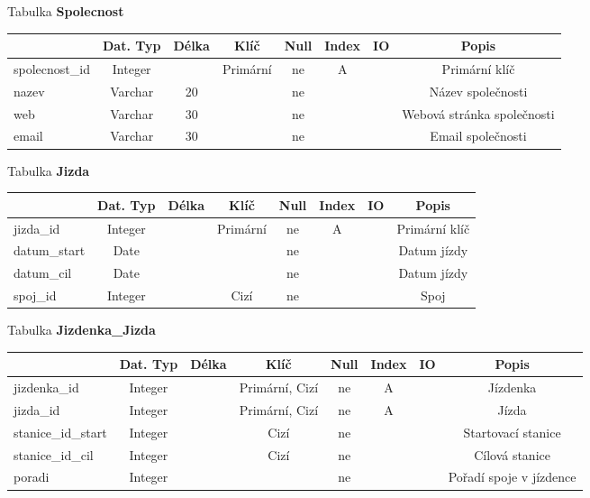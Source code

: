 \documentclass[11pt]{article}
\begin{document}
\noindent
Tabulka \textbf{Spolecnost}

\begin{table}[H]
    \begin{tabular}{|l|c|c|c|c|c|c|c|} \hline
                        & Dat. Typ  & Délka & Klíč      & Null  & Index & IO    & Popis \\ \hline
        spolecnost\_id	& Integer	&	    & Primární	& ne	& A		&       & Primární klíč \\ \hline
        nazev	        & Varchar	& 20	&	        & ne	&		&       & Název společnosti \\ \hline
        web             & Varchar   & 30    &           & ne    &       &       & Webová stránka společnosti \\ \hline
        email           & Varchar   & 30    &           & ne    &       &       & Email společnosti \\ \hline
    \end{tabular}
\end{table}

\noindent
Tabulka \textbf{Jizda}

\begin{table}[H]
    \begin{tabular}{|l|c|c|c|c|c|c|c|} \hline
                    & Dat. Typ  & Délka & Klíč      & Null  & Index & IO    & Popis \\ \hline
        jizda\_id	& Integer	&	    & Primární	& ne	& A		&       & Primární klíč \\ \hline
        datum\_start& Date		&	    &           & ne	&		&       & Datum jízdy \\ \hline
        datum\_cil	& Date		&	    &           & ne	&		&       & Datum jízdy \\ \hline
        spoj\_id	& Integer	&	    & Cizí	    & ne	&   	&	    & Spoj \\ \hline
    \end{tabular}
\end{table}

\noindent
Tabulka \textbf{Jizdenka\_Jizda}

\begin{table}[H]
    \begin{tabular}{|l|c|c|c|c|c|c|c|} \hline
                        & Dat. Typ  & Délka & Klíč              & Null  & Index & IO    & Popis \\ \hline
    jizdenka\_id        & Integer   &       & Primární, Cizí    & ne    & A     &       & Jízdenka \\ \hline
    jizda\_id           & Integer   &       & Primární, Cizí	& ne	& A     &       & Jízda \\ \hline
    stanice\_id\_start  & Integer   &       & Cizí              & ne    &       &       & Startovací stanice \\ \hline
    stanice\_id\_cil    & Integer   &       & Cizí              & ne    &       &       & Cílová stanice \\ \hline
    poradi              & Integer   &       &                   & ne    &       &       & Pořadí spoje v jízdence \\ \hline
    \end{tabular}
\end{table}
\end{document}
